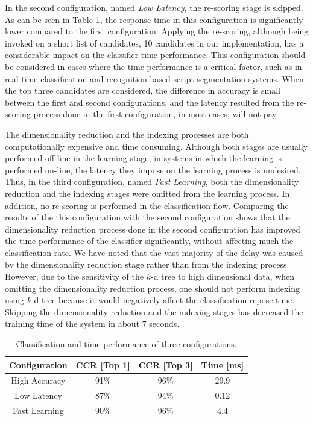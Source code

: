 In the second configuration, named \emph{Low Latency}, the re-scoring stage is skipped.
As can be seen in Table \ref{table:configurations}, the response time in this configuration is significantly lower compared to the first configuration.
Applying the re-scoring, although being invoked on a short list of candidates, 10 candidates in our implementation, has a considerable impact on the classifier time performance. 
This configuration should be considered in cases where the time performance is a critical factor, such as in real-time classification and recognition-based script segmentation systems.
When the top three candidates are considered, the difference in accuracy is small between the first and second configurations, and the latency resulted from the re-scoring process done in the first configuration, in most cases, will not pay. 

The dimensionality reduction and the indexing processes are both computationally expensive and time consuming. 
Although both stages are usually performed off-line in the learning stage, in systems in which the learning is performed on-line, the latency they impose on the learning process is undesired.
Thus, in the third configuration, named \emph{Fast Learning}, both the dimensionality reduction and the indexing stages were omitted from the learning process.
In addition, no re-scoring is performed in the classification flow.
Comparing the results of the this configuration with the second configuration shows that the dimensionality reduction process done in the second configuration has improved the time performance of the classifier significantly, without affecting much the classification rate.
We have noted that the vast majority of the delay was caused by the dimensionality reduction stage rather than from the indexing process.
However, due to the sensitivity of the $k$-d tree to high dimensional data, when omitting the dimensionality reduction process, one should not perform indexing using $k$-d tree because it would negatively affect the classification repose time.
Skipping the dimensionality reduction and the indexing stages has decreased the training time of the system in about 7 seconds.

\begin{table}
\centering
\renewcommand{\arraystretch}{1.2}
\begin{tabular}{ | c | c | c | c |}
  \hline
  \textbf{Configuration}  & \textbf{CCR [Top 1]}  & \textbf{CCR [Top 3]} & \textbf{Time [ms]}\\
  \hline
  High Accuracy & 91\% & 96\% & 29.9 \\ 
  \hline
  Low Latency   & 87\% & 94\% & 0.12 \\
  \hline
  Fast Learning & 90\% & 96\% & 4.4 \\ 
  \hline
\end{tabular}
\caption{Classification and time performance of three configurations.}
\label{table:configurations} 
\end{table}


